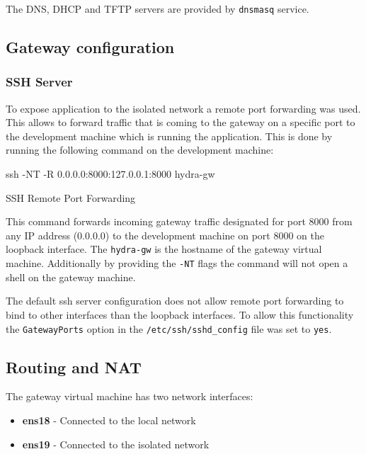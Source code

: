 \documentclass[../main.tex]{subfiles}
\begin{document}
The DNS, DHCP and TFTP servers are provided by \texttt{dnsmasq} \cite{dnsmasq} service.

\subsection{Gateway configuration}

\subsubsection{SSH Server}

To expose application to the isolated network a remote port forwarding was used. This allows to forward traffic that is coming to the gateway on a specific port to the development machine which
is running the application. This is done by running the following command on the development machine:

\begin{listing}[H]
  \begin{bashcode}
    ssh -NT -R 0.0.0.0:8000:127.0.0.1:8000 hydra-gw
  \end{bashcode}
  \caption{SSH Remote Port Forwarding}
  \label{lst:ssh-remote-port-forwarding}
\end{listing}

This command forwards incoming gateway traffic designated for port 8000 from any IP address (0.0.0.0) to the development machine on port 8000 on the loopback interface.
The \texttt{hydra-gw} is the hostname of the gateway virtual machine. Additionally by providing the \texttt{-NT} flags the command will not open a shell on the gateway machine.

The default ssh server configuration does not allow remote port forwarding to bind to other interfaces than the loopback interfaces.
To allow this functionality the \texttt{GatewayPorts} option in the \texttt{/etc/ssh/sshd\_config} file was set to \texttt{yes}.

\subsection{Routing and NAT}

The gateway virtual machine has two network interfaces:

\begin{itemize}
  \item \textbf{ens18} - Connected to the local network
  \item \textbf{ens19} - Connected to the isolated network
\end{itemize}
\end{document}
